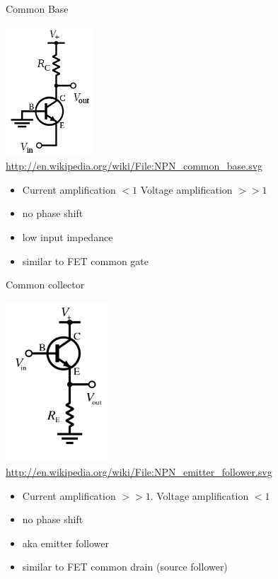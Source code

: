 \documentclass{beamer}
\begin{document}
\begin{frame}{Common Base}{}
\begin{center}
\includegraphics[width=0.25\textwidth]{images/common_base.png}\\
{\tiny \url{http://en.wikipedia.org/wiki/File:NPN_common_base.svg}}
\end{center}
\begin{itemize}
\item Current amplification $< 1$ Voltage amplification $>> 1$
\item no phase shift
\item low input impedance
\item similar to FET common gate
\end{itemize}
\end{frame}

\begin{frame}{Common collector}{}
\begin{center}
\includegraphics[width=0.3\textwidth]{images/common_collector.png}\\
{\tiny \url{http://en.wikipedia.org/wiki/File:NPN_emitter_follower.svg}}
\end{center}
\begin{itemize}
\item Current amplification $>>1$. Voltage amplification $< 1$
\item no phase shift
\item aka emitter follower
\item similar to FET common drain (source follower)
\end{itemize}
\end{frame}
\end{document}
